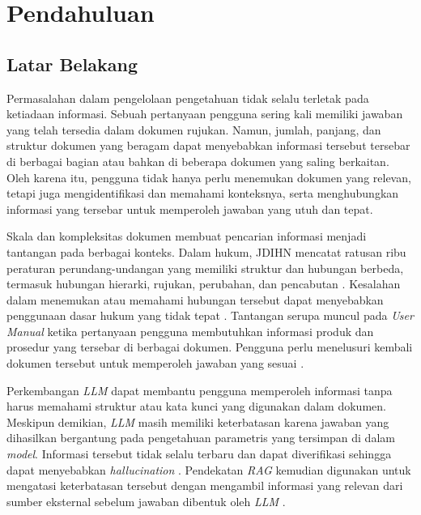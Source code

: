 \chapter[PENDAHULUAN]{Pendahuluan}
\label{chap:pendahuluan}

\section{Latar Belakang}


Permasalahan dalam pengelolaan pengetahuan tidak selalu terletak pada ketiadaan
informasi. Sebuah pertanyaan pengguna sering kali memiliki jawaban yang telah
tersedia dalam dokumen rujukan. Namun, jumlah, panjang, dan struktur dokumen yang
beragam dapat menyebabkan informasi tersebut tersebar di berbagai bagian atau
bahkan di beberapa dokumen yang saling berkaitan. Oleh karena itu, pengguna tidak
hanya perlu menemukan dokumen yang relevan, tetapi juga mengidentifikasi dan
memahami konteksnya, serta menghubungkan informasi yang tersebar untuk memperoleh
jawaban yang utuh dan tepat.

Skala dan kompleksitas dokumen membuat pencarian informasi menjadi tantangan pada
berbagai konteks. Dalam hukum, JDIHN mencatat ratusan ribu peraturan
perundang-undangan yang memiliki struktur dan hubungan berbeda, termasuk hubungan
hierarki, rujukan, perubahan, dan pencabutan
\parencite{bphnJDIHNDokumenHukum2025,uuPembentukanPeraturan2011}. Kesalahan dalam
menemukan atau memahami hubungan tersebut dapat menyebabkan penggunaan dasar
hukum yang tidak tepat \parencite{faisalGranularityAwareLegal2024}. Tantangan
serupa muncul pada \emph{User Manual} ketika pertanyaan pengguna membutuhkan
informasi produk dan prosedur yang tersebar di berbagai dokumen. Pengguna
perlu menelusuri kembali dokumen tersebut untuk memperoleh jawaban yang
sesuai \parencite{liQuestionAnsweringTechnical2018}.

Perkembangan \emph{LLM} dapat membantu pengguna memperoleh informasi tanpa harus memahami struktur
atau kata kunci yang digunakan dalam dokumen. Meskipun demikian, \emph{LLM} masih
memiliki keterbatasan karena jawaban yang dihasilkan bergantung pada pengetahuan
parametris yang tersimpan di dalam \emph{model}. Informasi tersebut tidak selalu
terbaru dan dapat diverifikasi sehingga dapat menyebabkan
\emph{hallucination} \parencite{jiSurveyHallucinationNatural2023}. Pendekatan \emph{RAG} kemudian
digunakan untuk mengatasi keterbatasan tersebut dengan mengambil informasi yang
relevan dari sumber eksternal sebelum jawaban dibentuk oleh \emph{LLM}
\parencite{lewisRetrievalAugmentedGenerationKnowledgeIntensive2021}.

